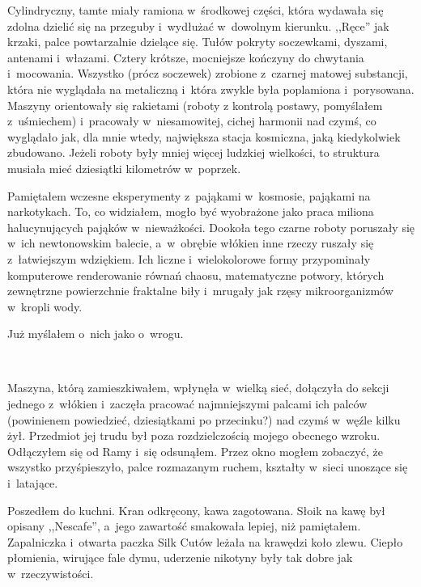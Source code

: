 \documentclass[oneside,polish,11pt,sfheadings]{mwbk}
\begin{document}
Cylindryczny, tamte miały ramiona w~środkowej części, która wydawała się
zdolna dzielić się na przeguby i~wydłużać w~dowolnym kierunku. ,,Ręce''
jak krzaki, palce powtarzalnie dzielące się. Tułów pokryty soczewkami,
dyszami, antenami i~włazami. Cztery krótsze, mocniejsze kończyny do
chwytania i~mocowania. Wszystko (prócz soczewek) zrobione z~czarnej
matowej substancji, która nie wyglądała na metaliczną i~która zwykle
była poplamiona i~porysowana. Maszyny orientowały się rakietami (roboty
z kontrolą postawy, pomyślałem z~uśmiechem) i~pracowały w~niesamowitej,
cichej harmonii nad czymś, co wyglądało jak, dla mnie wtedy, największa
stacja kosmiczna, jaką kiedykolwiek zbudowano. Jeżeli roboty były mniej
więcej ludzkiej wielkości, to struktura musiała mieć dziesiątki
kilometrów w~poprzek.

Pamiętałem wczesne eksperymenty z~pająkami w~kosmosie, pająkami na
narkotykach. To, co widziałem, mogło być wyobrażone jako praca miliona
halucynujących pająków w~nieważkości. Dookoła tego czarne roboty
poruszały się w~ich newtonowskim balecie, a~w~obrębie włókien inne
rzeczy ruszały się z~łatwiejszym wdziękiem. Ich liczne i~wielokolorowe
formy przypominały komputerowe renderowanie równań chaosu, matematyczne
potwory, których zewnętrzne powierzchnie fraktalne biły i~mrugały jak
rzęsy mikroorganizmów w~kropli wody.

Już myślałem o~nich jako o~wrogu.

~

Maszyna, którą zamieszkiwałem, wpłynęła w~wielką sieć, dołączyła do
sekcji jednego z~włókien i~zaczęła pracować najmniejszymi palcami ich
palców (powinienem powiedzieć, dziesiątkami po przecinku?) nad czymś w~węźle kilku żył. Przedmiot jej trudu był poza rozdzielczością mojego
obecnego wzroku. Odłączyłem się od Ramy i~się odsunąłem. Przez okno
mogłem zobaczyć, że wszystko przyśpieszyło, palce rozmazanym ruchem,
kształty w~sieci unoszące się i~latające.

Poszedłem do kuchni. Kran odkręcony, kawa zagotowana. Słoik na kawę był
opisany ,,Nescafe'', a~jego zawartość smakowała lepiej, niż pamiętałem.
Zapalniczka i~otwarta paczka Silk Cutów leżała na krawędzi koło zlewu.
Ciepło płomienia, wirujące fale dymu, uderzenie nikotyny były tak dobre
jak w~rzeczywistości.
\end{document}
